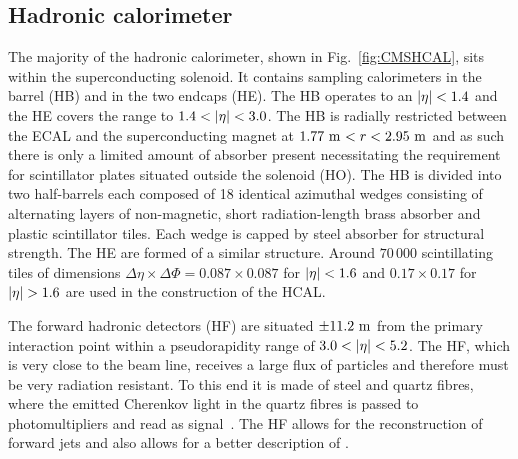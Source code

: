 \subsection{Hadronic calorimeter}
\label{ssec:HCAL}
The majority of the hadronic calorimeter, shown in Fig.~\ref{fig:CMSHCAL}, sits within the superconducting solenoid. 
It contains sampling calorimeters in the barrel (HB) and in the two endcaps (HE). 
The HB operates to an $\lvert \eta \rvert<1.4$ and the HE covers the range to $1.4<\lvert \eta \rvert<3.0$.
The HB is radially restricted between the ECAL and the superconducting magnet at $1.77\mathrm{~m}^{} < r < 2.95\mathrm{~m}^{}$ and as such there is only a limited amount of absorber present necessitating the requirement for scintillator plates situated outside the solenoid (HO).
The HB is divided into two half-barrels each composed of 18 identical azimuthal wedges consisting of alternating layers of non-magnetic, short radiation-length brass absorber and plastic scintillator tiles.
Each wedge is capped by steel absorber for structural strength.
The HE are formed of a similar structure.
Around $70\,000$ scintillating tiles of dimensions $\Delta\eta\times\Delta\Phi=0.087\times0.087$ for $\lvert \eta \rvert<1.6$ and $0.17\times0.17$ for $\lvert \eta \rvert>1.6$ are used in the construction of the HCAL.

The forward hadronic detectors (HF) are situated $\pm11.2\mathrm{~m}^{}$ from the primary interaction point within a pseudorapidity range of $3.0<\lvert \eta \rvert<5.2$.
The HF, which is very close to the beam line, receives a large flux of particles and therefore must be very radiation resistant.
To this end it is made of steel and quartz fibres, where the emitted Cherenkov light in the quartz fibres is passed to photomultipliers and read as signal~\cite{HF}.
The HF allows for the reconstruction of forward jets and also allows for a better description of \ptmiss{}.

